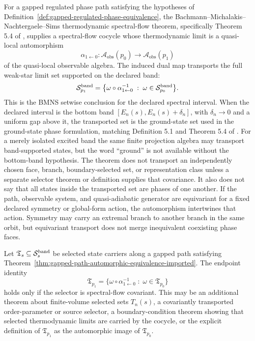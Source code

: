 \begin{theorem}
\label{thm:gapped-path-automorphic-equivalence-imported}
For a gapped regulated phase path satisfying the hypotheses of
Definition~\ref{def:gapped-regulated-phase-equivalence}, the
Bachmann--Michalakis--Nachtergaele--Sims thermodynamic spectral-flow theorem,
specifically Theorem 5.4 of
\cite{BachmannMichalakisNachtergaeleSims2012Automorphic}, supplies a
spectral-flow cocycle whose thermodynamic limit is a quasi-local automorphism
\[
  \alpha_{1\leftarrow0}:\mathcal A_{\mathrm{obs}}(p_0)
  \longrightarrow \mathcal A_{\mathrm{obs}}(p_1)
\]
of the quasi-local observable algebra.  The induced dual map transports the
full weak-star limit set supported on the declared band:
\[
  \mathcal S_{p_1}^{\rm band}
  =
  \bigl\{
    \omega\circ\alpha_{1\leftarrow0}^{-1}
    \;:\;
    \omega\in\mathcal S_{p_0}^{\rm band}
  \bigr\}.
\]
This is the BMNS setwise conclusion for the declared spectral interval.  When
the declared interval is the bottom band
\([E_n(s),E_n(s)+\delta_n]\), with \(\delta_n\to0\) and a uniform gap above it,
the transported set is the ground-state set used in the ground-state phase
formulation, matching Definition 5.1 and Theorem 5.4 of
\cite{NachtergaeleSimsYoung2019QuasiLocality}.  For a merely isolated excited
band the same finite projection algebra may transport band-supported states,
but the word ``ground'' is not available without the bottom-band hypothesis.
The theorem does not transport an independently chosen face, branch,
boundary-selected set, or representation class unless a separate selector
theorem or definition supplies that covariance.  It also does not say that all
states inside the transported set are phases of one another.  If the path,
observable system, and quasi-adiabatic generator are equivariant for a fixed
declared symmetry or global-form action, the automorphism intertwines that
action.  Symmetry may carry an extremal branch to another branch in the same
orbit, but equivariant transport does not merge inequivalent coexisting phase
faces.
\end{theorem}

\begin{proposition}
\label{prop:selected-state-carrier-transport-selector}
Let \(\mathfrak T_s\subseteq\mathcal S_s^{\rm band}\) be selected state
carriers along a gapped path satisfying
Theorem~\ref{thm:gapped-path-automorphic-equivalence-imported}.  The endpoint
identity
\[
  \mathfrak T_{p_1}
  =
  \bigl\{
    \omega\circ\alpha_{1\leftarrow0}^{-1}
    \;:\;
    \omega\in\mathfrak T_{p_0}
  \bigr\}
\]
holds only if the selector is spectral-flow covariant.  This may be an
additional theorem about finite-volume selected sets
\(T_n(s)\), a covariantly transported order-parameter or source selector, a
boundary-condition theorem showing that selected thermodynamic limits are
carried by the cocycle, or the explicit definition of
\(\mathfrak T_{p_1}\) as the automorphic image of \(\mathfrak T_{p_0}\).
\end{proposition}

